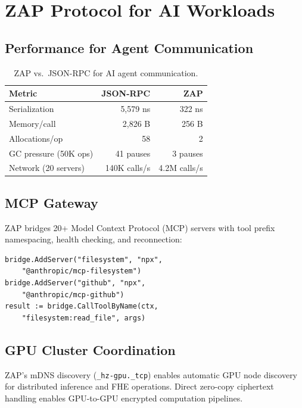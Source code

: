 \documentclass[11pt,letterpaper]{article}
\begin{document}
\section{ZAP Protocol for AI Workloads}

\subsection{Performance for Agent Communication}

\begin{table}[H]
\centering
\begin{tabular}{@{}lrr@{}}
\toprule
\textbf{Metric} & \textbf{JSON-RPC} & \textbf{ZAP} \\
\midrule
Serialization & 5,579 ns & 322 ns \\
Memory/call & 2,826 B & 256 B \\
Allocations/op & 58 & 2 \\
GC pressure (50K ops) & 41 pauses & 3 pauses \\
Network (20 servers) & 140K calls/s & 4.2M calls/s \\
\bottomrule
\end{tabular}
\caption{ZAP vs.\ JSON-RPC for AI agent communication.}
\label{tab:zap-ai}
\end{table}

\subsection{MCP Gateway}

ZAP bridges 20+ Model Context Protocol (MCP) servers with tool prefix namespacing, health checking, and reconnection:

\begin{lstlisting}[caption={MCP gateway aggregation.}]
bridge.AddServer("filesystem", "npx",
    "@anthropic/mcp-filesystem")
bridge.AddServer("github", "npx",
    "@anthropic/mcp-github")
result := bridge.CallToolByName(ctx,
    "filesystem:read_file", args)
\end{lstlisting}

\subsection{GPU Cluster Coordination}

ZAP's mDNS discovery (\texttt{\_hz-gpu.\_tcp}) enables automatic GPU node discovery for distributed inference and FHE operations. Direct zero-copy ciphertext handling enables GPU-to-GPU encrypted computation pipelines.
\end{document}
